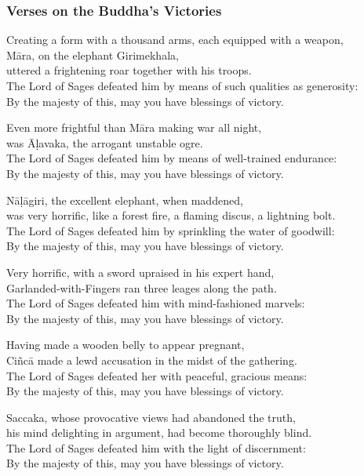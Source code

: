 \subsubsection{Verses on the Buddha's Victories}


Creating a form with a thousand arms, each equipped with a weapon,\\
Māra, on the elephant Girimekhala,\\
uttered a frightening roar together with his troops.\\
The Lord of Sages defeated him by means of such qualities as generosity:\\
By the majesty of this, may you have blessings of victory.

Even more frightful than Māra making war all night,\\
was Āḷavaka, the arrogant unstable ogre.\\
The Lord of Sages defeated him by means of well-trained endurance:\\
By the majesty of this, may you have blessings of victory.

Nāḷāgiri, the excellent elephant, when maddened,\\
was very horrific, like a forest fire, a flaming discus, a lightning bolt.\\
The Lord of Sages defeated him by sprinkling the water of goodwill:\\
By the majesty of this, may you have blessings of victory.

Very horrific, with a sword upraised in his expert hand,\\
Garlanded-with-Fingers ran three leages along the path.\\
The Lord of Sages defeated him with mind-fashioned marvels:\\
By the majesty of this, may you have blessings of victory.

Having made a wooden belly to appear pregnant,\\
Ciñcā made a lewd accusation in the midst of the gathering.\\
The Lord of Sages defeated her with peaceful, gracious means:\\
By the majesty of this, may you have blessings of victory.

Saccaka, whose provocative views had abandoned the truth,\\
his mind delighting in argument, had become thoroughly blind.\\
The Lord of Sages defeated him with the light of discernment:\\
By the majesty of this, may you have blessings of victory.

